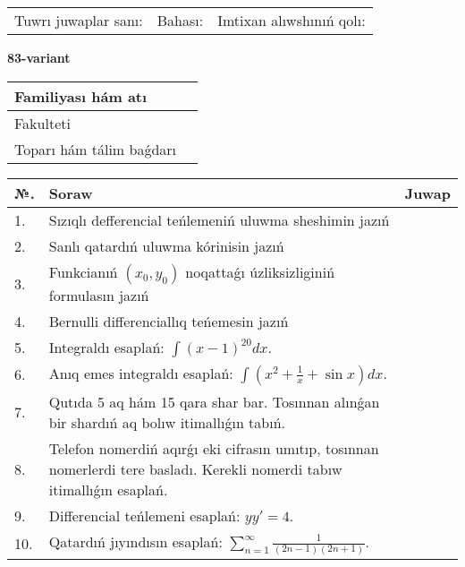 \documentclass{article}
\begin{document}
\vspace{1cm}

\begin{tabular}{ c c c }
Tuwrı juwaplar sanı: \underline{\hspace{2cm}} & Bahası: \underline{\hspace{2cm}} & Imtixan alıwshınıń qolı: \underline{\hspace{2cm}} \\
\end{tabular}

\newpage

\begin{center}\textbf{83-variant}\end{center}

\bgroup
\def\arraystretch{1.5}
\begin{tabular}{ |m{6cm}|m{10cm}| }
  \hline
  Familiyası hám atı & \\
  \hline
  Fakulteti &\\
  \hline
  Toparı hám tálim baǵdarı & \\
  \hline
\end{tabular}
\egroup

\vspace{0.5cm}

\bgroup
\def\arraystretch{2}
\begin{tabular}{ |l|m{8cm}|m{7cm}| }
  \hline
  №. & Soraw & Juwap \\
  \hline
  1. & Sızıqlı defferencial teńlemeniń uluwma sheshimin jazıń &  \\
  \hline
  2. & Sanlı qatardıń uluwma kórinisin jazıń &  \\
  \hline
  3. & Funkcianıń $(x_{0}, y_{0})$ noqattaǵı úzliksizliginiń formulasın jazıń &  \\
  \hline
  4. & Bernulli differenciallıq teńemesin jazıń &  \\
  \hline
  5. & Integraldı esaplań: $\displaystyle\int (x - 1)^{20}dx$. &  \\
  \hline
  6. & Anıq emes integraldı esaplań: $\displaystyle\int(x^{2}+\frac{1}{x} + \sin x)dx$. &  \\
  \hline
  7. & Qutıda 5 aq hám 15 qara shar bar. Tosınnan alınǵan bir shardıń aq bolıw itimallıǵın tabıń. &  \\
  \hline
  8. & Telefon nomerdiń aqırǵı eki cifrasın umıtıp, tosınnan nomerlerdi tere basladı. Kerekli nomerdi tabıw itimallıǵın esaplań. &  \\
  \hline
  9. & Differencial teńlemeni esaplań: $yy'= 4$. &  \\
  \hline
  10. & Qatardıń jıyındısın esaplań: $\displaystyle\sum_{n = 1}^{\infty}\frac{1}{(2n - 1)(2n + 1)}$. &  \\
  \hline
\end{tabular}
\egroup
\end{document}
